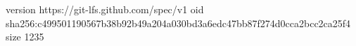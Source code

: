 version https://git-lfs.github.com/spec/v1
oid sha256:c499501190567b38b92b49a204a030bd3a6edc47bb87f274d0cca2bcc2ca25f4
size 1235
